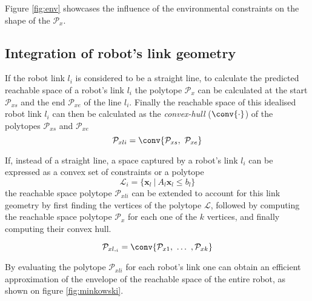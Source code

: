 Figure \ref{fig:env} showcases the influence of the environmental constraints on the shape of the $\mathcal{P}_x$.


\vspace{-0.2cm}
\subsection{Integration of robot's link geometry}

If the robot link $l_i$ is considered to be a straight line, to calculate the predicted reachable space of a robot's link $l_i$ the polytope $\mathcal{P}_x$ can be calculated at the start $\mathcal{P}_{xs}$ and the end $\mathcal{P}_{xe}$ of the line $l_i$.  Finally the reachable space of this idealised robot link $l_i$ can then be calculated as the \textit{convex-hull} ($\conv{\cdot}$) of the polytopes $\mathcal{P}_{xs}$ and $\mathcal{P}_{xe}$
\begin{equation}
    \mathcal{P}_{xli} = \conv{  \mathcal{P}_{xs}, ~ \mathcal{P}_{xe}}
\end{equation}

If, instead of a straight line, a space captured by a robot's link $l_i$ can be expressed as a convex set of constraints or a polytope
\begin{equation}
    \mathcal{L}_i = \Big \{ \bm{x}_l ~ |~ A_l \bm{x}_l \leq b_l \Big\}
\end{equation}
the reachable space polytope $\mathcal{P}_{xli}$ can be extended to account for this link geometry by first finding the vertices of the polytope $\mathcal{L}$, followed by computing the reachable space polytope $\mathcal{P}_{x}$ for each one of the $k$ vertices, and finally computing their convex hull. 

\begin{equation}
    \mathcal{P}_{xl,_i} = \conv{  \mathcal{P}_{x1}, ~ \dots ~, \mathcal{P}_{xk} }
\end{equation}

By evaluating the polytope $\mathcal{P}_{xli}$ for each robot's link one can obtain an efficient approximation of the envelope of the reachable space of the entire robot, as shown on figure \ref{fig:minkowski}.



